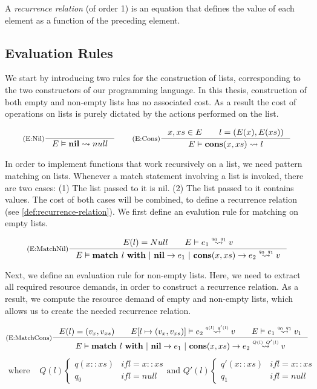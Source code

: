 \begin{definition}\label{def:recurrence-relation}
   A \emph{recurrence relation} (of order 1) is an equation that defines the value of each element as a function of the preceding element.
\end{definition}

\subsection{Evaluation Rules}

We start by introducing two rules for the construction of lists, corresponding to the two constructors of our programming language. In this thesis, construction of both empty and non-empty lists has no associated cost. As a result the cost of operations on lists is purely dictated by the actions performed on the list. 

\[
   \inference[(E:Nil)]
   {}
   {\evals{E}{\listnil}{null}{}{}}
   \qquad
   \inference[(E:Cons)]
   {\contains{E}{x, xs} \qquad l = (E(x), E(xs))}
   {\evals{E}{\cons{x}{xs}}{l}{}{}}
\]

In order to implement functions that work recursively on a list, we need pattern matching on lists. Whenever a match statement involving a list is invoked, there are two cases: (1) The list passed to it is nil. (2) The list passed to it contains values. The cost of both cases will be combined, to define a recurrence relation (see \cref{def:recurrence-relation}). We first define an evalution rule for matching on empty lists.

\[
   \inference[(E:MatchNil)]
   {E(l) = Null \qquad \evals{E}{e_1}{v}{q_0}{q_1}}
   {\evals{E}{\listmatch{l}{e_1}{e_2}}{v}{q_0}{q_1}}
\]

Next, we define an evaluation rule for non-empty lists. Here, we need to extract all required resource demands, in order to construct a recurrence relation. As a result, we compute the resource demand of empty and non-empty lists, which allows us to create the needed recurrence relation.

\[
   \inference[(E:MatchCons)]
   {E(l) = (v_x, v_{xs}) \qquad \evals{\envaugment{E}{l}{(v_x, v_{xs})}}{e_2}{v}{q(l)}{q'(l)} \qquad \evals{E}{e_1}{v_1}{q_0}{q_1}}
   {\evals{E}{\listmatch{l}{e_1}{e_2}}{v}{Q(l)}{Q'(l)}}
\]
\[
   \begin{aligned}
      \text{where }  & Q(l) \begin{cases*}
         q(x :: xs)     & if l = x :: xs\\
         q_0            & if l = null
         \end{cases*} \text{and } Q'(l) \begin{cases*}
         q'(x :: xs)     & if l = x :: xs\\
         q_1            & if l = null
      \end{cases*}
   \end{aligned}
\]


